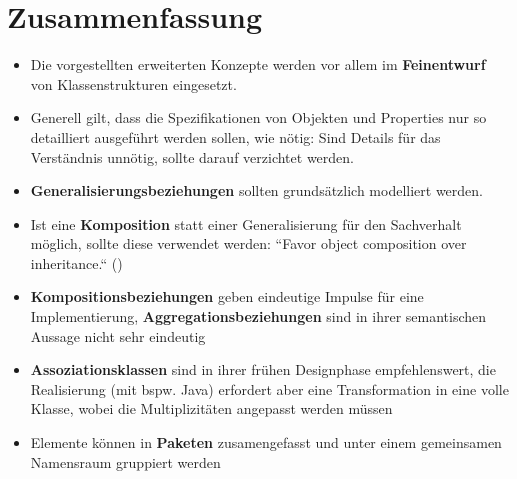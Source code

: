 \section{Zusammenfassung}


\begin{itemize}
    \item Die vorgestellten erweiterten Konzepte werden vor allem im \textbf{Feinentwurf} von Klassenstrukturen eingesetzt.
    \item Generell gilt, dass die Spezifikationen von Objekten und Properties nur so detailliert ausgeführt werden sollen, wie nötig: Sind Details für das Verständnis unnötig, sollte darauf verzichtet werden.
    \item \textbf{Generalisierungsbeziehungen} sollten grundsätzlich modelliert werden.
    \item Ist eine \textbf{Komposition} statt einer Generalisierung für den Sachverhalt möglich, sollte diese verwendet werden: ``Favor object composition over inheritance.`` (\cite[19 f.]{GHJV94})
    \item \textbf{Kompositionsbeziehungen} geben eindeutige Impulse für eine Implementierung, \textbf{Aggregationsbeziehungen} sind in ihrer semantischen Aussage nicht sehr eindeutig
    \item \textbf{Assoziationsklassen} sind in ihrer frühen Designphase empfehlenswert, die Realisierung (mit {bspw.} Java) erfordert aber eine Transformation in eine volle Klasse, wobei die Multiplizitäten angepasst werden müssen
    \item Elemente können in \textbf{Paketen} zusamengefasst und unter einem gemeinsamen Namensraum gruppiert werden
\end{itemize}
